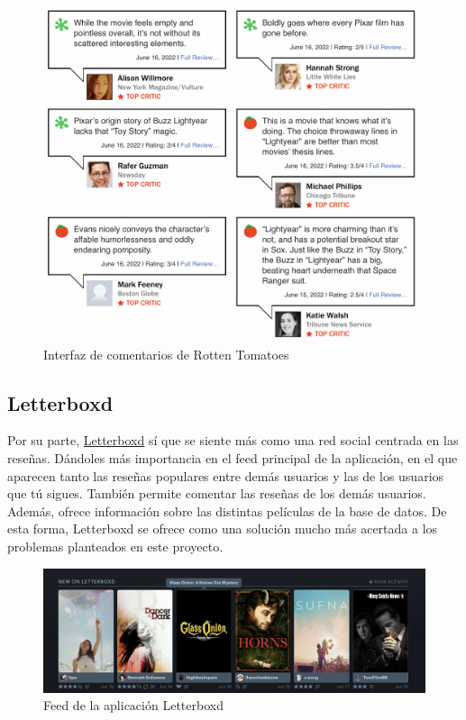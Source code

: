 \begin{figure}[H]
    \centering	
    \includegraphics[scale=0.25]{img/rotten-tomatoes-comments.png}
    \caption{ Interfaz de comentarios de Rotten Tomatoes }\label{fig:rotten_tomatoes}
\end{figure}

\subsection{Letterboxd}
Por su parte, \href{https://letterboxd.com}{Letterboxd} sí que se siente más como una red social centrada en las
reseñas. Dándoles más importancia en el feed principal de la aplicación, en el que aparecen tanto las reseñas populares
entre demás usuarios y las de los usuarios que tú sigues. También permite comentar las reseñas de los demás usuarios.
Además, ofrece información sobre las distintas películas de la base de datos. De esta forma, Letterboxd se ofrece como
una solución mucho más acertada a los problemas planteados en este proyecto.

\begin{figure}[H]
    \centering	
    \includegraphics[scale=0.4]{img/letterboxd-feed.png}
    \caption{ Feed de la aplicación Letterboxd }\label{fig:letterboxd}
\end{figure}

